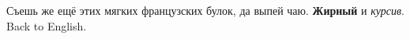 \documentclass{article}
\begin{document}
Съешь же ещё этих мягких французских булок, да выпей чаю.
\textbf{Жирный} и \textit{курсив}.
Back to English.
\end{document}
